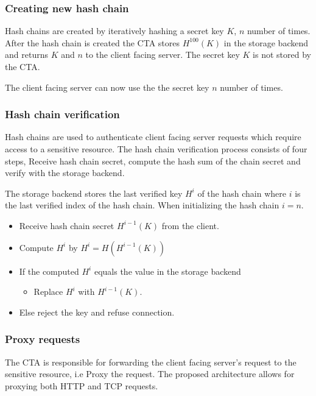\documentclass[12pt,conference]{IEEEtran}
\begin{document}
\subsubsection*{Creating new hash chain}
Hash chains are created by iteratively hashing a secret key $K$, $n$ number of times. 
After the hash chain is created the CTA stores $H^{100}(K)$ in the storage backend and returns $K$ and $n$ to the client facing server. The secret key $K$ is not stored by the CTA.

The client facing server can now use the the secret key $n$ number of times.

\subsubsection*{Hash chain verification}
Hash chains are used to authenticate client facing server requests which require access to a sensitive resource. The hash chain verification process consists of four steps, Receive hash chain secret, compute the hash sum of the chain secret and verify with the storage backend.

The storage backend stores the last verified key $H^{i}$ of the hash chain where $i$ is the last verified index of the hash chain. When initializing the hash chain $i = n$. 

\begin{itemize}
\item Receive hash chain secret $H^{i-1}(K)$ from the client.
\item Compute $H^{i}$ by $H^{i} = H(H^{i-1}(K))$

\item If the computed $H^{i}$ equals the value in the storage backend
\begin{itemize}
\item Replace $H^{i}$ with $H^{i-1}(K)$.
\end{itemize}
\item Else reject the key and refuse connection.
\end{itemize}


\subsubsection*{Proxy requests}

The CTA is responsible for forwarding the client facing server's request to the sensitive resource, i.e Proxy the request. The proposed architecture allows for proxying both HTTP and TCP requests. 
\end{document}
